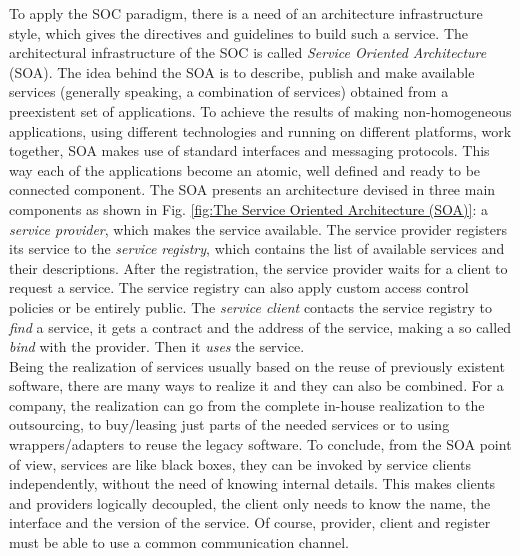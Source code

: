 To apply the SOC paradigm, there is a need of an architecture infrastructure style, which gives the directives and guidelines to build such a service.  
The architectural infrastructure of the SOC is called \textit{Service Oriented Architecture} (SOA). 
The idea behind the SOA is to describe, publish and make available services (generally speaking, a combination of services) obtained from a preexistent set of applications. 
To achieve the results of making non-homogeneous applications, using different technologies and running on different platforms, work together, SOA makes use of standard interfaces and messaging protocols. This way each of the applications become an atomic, well defined and ready to be connected component. 
The SOA presents an architecture devised in three main components \cite{Pernici04} as shown in Fig. \ref{fig:The Service Oriented Architecture (SOA)}:
a \textit{service provider}, which makes the service available. The service provider registers its service to the \textit{service registry}, which contains the list of available services and their descriptions. After the registration, the service provider waits for a client to request a service. The service registry can also apply custom access control policies or be entirely public. 
The \textit{service client} contacts the service registry to \textit{find} a service, it gets a contract and the address of the service, making a so called \textit{bind} with the provider. Then it \textit{uses} the service.\\

Being the realization of services usually based on the reuse of previously existent software, there are many ways to realize it and they can also be combined. For a company, the realization can go from the complete in-house realization to the outsourcing, to buy/leasing just parts of the needed services or to using wrappers/adapters to reuse the legacy software.
To conclude, from the SOA point of view, services are like black boxes, they can be invoked by service clients independently, without the need of knowing internal details. This makes clients and providers logically decoupled, the client only needs to know the name, the interface and the version of the service. Of course, provider, client and register must be able to use a common communication channel. 

